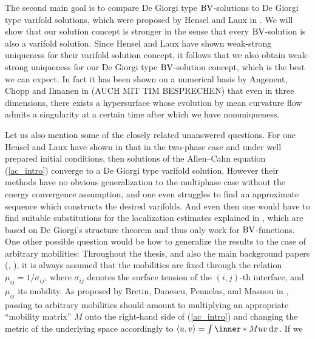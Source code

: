 The second main goal is to compare De Giorgi type $ \operatorname{BV} $-solutions to De 
Giorgi type varifold solutions, which were 
proposed by Hensel and Laux in 
\cite{hensel_laux_varifold_solution_concept_for_mean_curvature_flow}. We will 
show that our solution concept is stronger in the sense that every $ \operatorname{BV} 
$-solution is also a varifold solution. Since Hensel and Laux have shown 
weak-strong uniqueness for their varifold solution concept, it follows that we 
also obtain weak-strong uniqueness for our De Giorgi type $ \operatorname{BV} $-solution 
concept, which is the best we can expect. In fact it has been shown on a 
numerical basis by Angenent, Chopp and Ilmanen in 
\cite{angenent_chopp_ilmanen_a_computed_example_of_nonuniqueness_of_mcf}
(AUCH MIT TIM BESPRECHEN)
that even in three dimensions, there exists a hypersurface whose evolution by 
mean curvature 
flow admits a singularity at a certain time after which we have nonuniqueness.

Let us also mention some of the closely related unanswered questions. For one 
Hensel and Laux have shown in 
\cite{hensel_laux_varifold_solution_concept_for_mean_curvature_flow}
that in the two-phase case and under well prepared initial conditions, then 
solutions of the Allen--Cahn equation (\ref{ac_intro}) converge to a De Giorgi 
type varifold solution. However their methods have no obvious generalization to 
the multiphase case without the energy convergence assumption, and one even 
struggles to find an approximate sequence 
which constructs the desired varifolds. And even then one would have to find 
suitable substitutions for the localization estimates explained in 
, which are based on De Giorgi's structure 
theorem and thus only work for $ \operatorname{BV} $-functions.
One other possible question would be how to generalize the results to the case 
of 
arbitrary mobilities: Throughout the thesis, and also the main background 
papers 
(\cite{convergence_of_allen_cahn_equation_to_multiphase_mean_curvature_flow},
\cite{hensel_laux_varifold_solution_concept_for_mean_curvature_flow}), it is 
always assumed that the mobilities are fixed through the relation $ \mu_{ i j } 
= 1/ \sigma_{ i j } $, where $ \sigma_{ i j } $ denotes the surface tension of 
the $ ( i , j ) $-th interface, and $ \mu_{ i j } $ its mobility. As proposed by
Bretin, Danescu, Penuelas, and Masnou in 
\cite{bretin_dansecu_penuelas_masnou_a_metric_based_approach_to_mmcf_with_mobilities},
passing
to arbitrary mobilities should 
amount to multiplying an appropriate \enquote{mobility matrix} $ M $ onto the 
right-hand side of (\ref{ac_intro}) and changing the metric of the underlying 
space accordingly to $ \langle u , v \rangle = \int \inner*{M u}{ v} \dd{ x } $.
If we 

